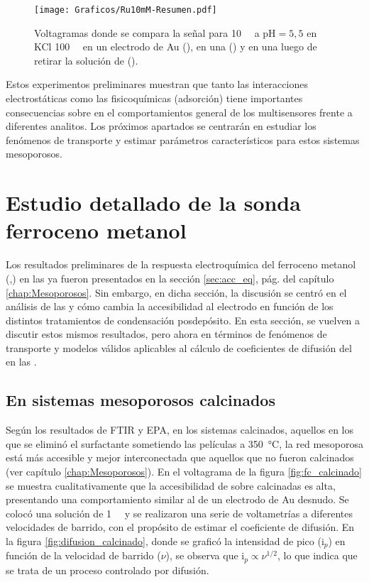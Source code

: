 				\begin{figure}[h!]
				\centering
				\texttt{[image: Graficos/Ru10mM-Resumen.pdf]}
		        \caption{Voltagramas donde se compara la señal para \ru\space \SI{10}{\milli\Molar} a $\text{pH}=5,5$ en KCl \SI{100}{\milli\Molar} en un electrodo de Au (\usebox{\punteado}), en una \pdmF\space(\usebox{\gris}) y en una \pdmF\space luego de retirar la solución de \ru (\usebox{\negro}).}
		        \label{fig:Ru10mM-resumen}
		      	\end{figure}

		\vspace*{3mm}Estos experimentos preliminares muestran que tanto las interacciones electrostáticas como las fisicoquímicas (adsorción) tiene importantes consecuencias sobre en el comportamientos general de los multisensores frente a diferentes analitos. 
		Los próximos apartados se  centrarán en estudiar los fenómenos de transporte y estimar parámetros característicos para estos sistemas mesoporosos.

\section{Estudio detallado de la sonda ferroceno metanol}\label{sec:difusion}

	 Los resultados preliminares de la respuesta electroquímica del ferroceno metanol (\ferroceno,\fc) en las \pdmF\space ya fueron presentados en la sección \ref{sec:acc_eq}, pág. \pageref{sec:acc_eq} del capítulo \ref{chap:Mesoporosos}. Sin embargo, en dicha sección, la discusión se centró en el análisis de las \pdm\space y cómo cambia la accesibilidad al electrodo en función de los distintos tratamientos de condensación posdepósito.
	 En esta sección, se vuelven a discutir estos mismos resultados, pero ahora en términos de fenómenos de transporte y modelos válidos aplicables al cálculo de coeficientes de difusión del \fc\space en las \pdm.

	\subsection{En sistemas mesoporosos calcinados}

	 Según los resultados de FTIR y EPA, en los sistemas calcinados, aquellos en los que se eliminó el surfactante sometiendo las películas a \SI{350}{\celsius}, la red mesoporosa está más accesible y mejor interconectada que aquellos que no fueron calcinados (ver capítulo \ref{chap:Mesoporosos}). En el voltagrama de la figura \ref{fig:fc_calcinado} se muestra cualitativamente que la accesibilidad de \fc\space sobre \pdmF\space calcinadas es alta, presentando una comportamiento similar al de un electrodo de Au desnudo. Se colocó una solución de \fc\space \SI{1}{\milli\Molar} y se realizaron una serie de voltametrías a diferentes velocidades de barrido, con el propósito de estimar el coeficiente de difusión. En la figura \ref{fig:difusion_calcinado}, donde se graficó la intensidad de pico (i$_p$) en función de la velocidad de barrido ($\nu$), se observa que $\text{i}_p \propto \nu^{1/2}$, lo que indica que se trata de un proceso controlado por difusión. 

